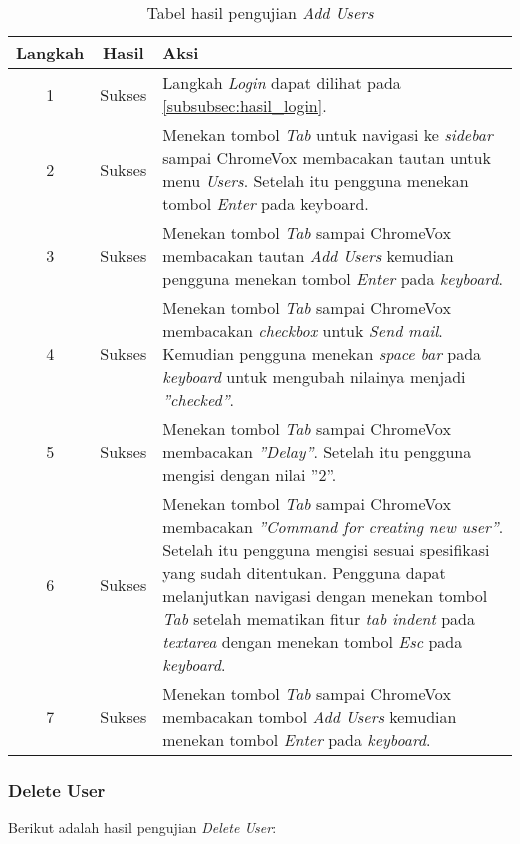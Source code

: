 \begin{table}[H]
	\centering
	\caption{Tabel hasil pengujian \textit{Add Users}}
	\label{tab:hasil_add_users}
	\begin{tabular}{|c|c|p{12cm}|}
		\toprule
		Langkah & Hasil & Aksi\\
		\midrule
		1 & Sukses & Langkah \textit{Login} dapat dilihat pada \ref{subsubsec:hasil_login}.\\
		2 & Sukses & Menekan tombol \textit{Tab} untuk navigasi ke \textit{sidebar} sampai ChromeVox membacakan tautan untuk menu \textit{Users}. Setelah itu pengguna menekan tombol \textit{Enter} pada keyboard.\\
		3 & Sukses & Menekan tombol \textit{Tab} sampai ChromeVox membacakan tautan \textit{Add Users} kemudian pengguna menekan tombol \textit{Enter} pada \textit{keyboard}.\\
		4 & Sukses & Menekan tombol \textit{Tab} sampai ChromeVox membacakan \textit{checkbox} untuk \textit{Send mail}. Kemudian pengguna menekan \textit{space bar} pada \textit{keyboard} untuk mengubah nilainya menjadi \textit{''checked''}.\\
		5 & Sukses & Menekan tombol \textit{Tab} sampai ChromeVox membacakan \textit{''Delay''}. Setelah itu pengguna mengisi dengan nilai ''2''.\\
		6 & Sukses & Menekan tombol \textit{Tab} sampai ChromeVox membacakan \textit{''Command for creating new user''}. Setelah itu pengguna mengisi sesuai spesifikasi yang sudah ditentukan. Pengguna dapat melanjutkan navigasi dengan menekan tombol \textit{Tab} setelah mematikan fitur \textit{tab indent} pada \textit{textarea} dengan menekan tombol \textit{Esc} pada \textit{keyboard}.\\
		7 & Sukses & Menekan tombol \textit{Tab} sampai ChromeVox membacakan tombol \textit{Add Users} kemudian menekan tombol \textit{Enter} pada \textit{keyboard}.\\
		\bottomrule
	\end{tabular}
\end{table}

\subsubsection{Delete User}
\label{subsubsec:hasil_delete_user}
Berikut adalah hasil pengujian \textit{Delete User}:

